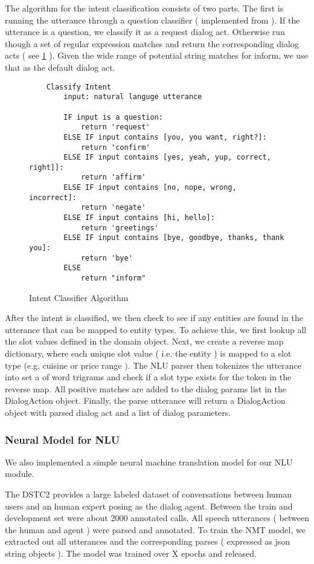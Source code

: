 The algorithm for the intent classification consists of two parts. The first is running the utterance through a question classifier ( implemented from \cite{chewning_lord_yarvis_2015} ). If the utterance is a question, we classify it as a request dialog act. Otherwise run though a set of regular expression matches and return the corresponding dialog acts ( see \ref{fig:intent_clf} ). Given the wide range of potential string matches for inform, we use that as the default dialog act. 

\begin{figure}[h!]
	\caption{ Intent Classifier Algorithm}
	\label{fig:intent_clf}
	\begin{lstlisting}
	Classify Intent
		input: natural languge utterance
		
		IF input is a question:
			return 'request'
		ELSE IF input contains [you, you want, right?]:
			return 'confirm'
		ELSE IF input contains [yes, yeah, yup, correct, right]]:
			return 'affirm'
		ELSE IF input contains [no, nope, wrong, incorrect]:
			return 'negate'
		ELSE IF input contains [hi, hello]:
			return 'greetings'
		ELSE IF input contains [bye, goodbye, thanks, thank you]:
			return 'bye'
		ELSE
			return "inform"
	\end{lstlisting}
\end{figure}

After the intent is classified, we then check to see if any entities are found in the utterance that can be mapped to entity types. To achieve this, we first lookup all the slot values defined in the domain object. Next, we create a reverse map dictionary, where each unique slot value ( i.e. the entity ) is mapped to a slot type (e.g. cuisine or price range ). The NLU parser then tokenizes the utterance into set a of word trigrams and check if a slot type exists for the token in the reverse map. All positive matches are added to the dialog params list in the DialogAction object. Finally, the parse utterance will return a DialogAction object with parsed dialog act and a list of dialog parameters. 

\subsubsection{Neural Model for NLU}

We also implemented a simple neural machine translation model for our NLU module. 

The DSTC2 provides a large labeled dataset of conversations between human users and an human expert posing as the dialog agent. Between the train and development set were about 2000 annotated calls. All speech utterances ( between the human and agent ) were parsed and annotated. To train the NMT model, we extracted out all utterances and the corresponding parses ( expressed as json string objects ). The model was trained over X epochs and released.

